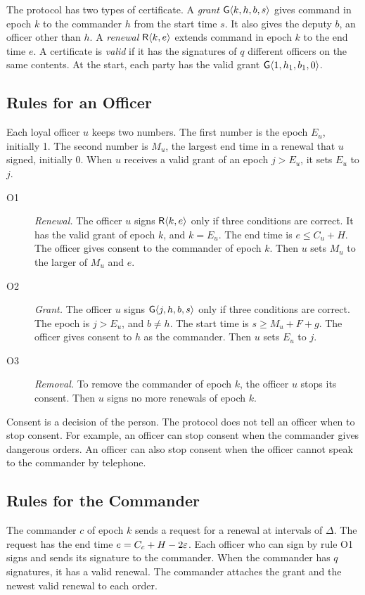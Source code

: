 The protocol has two types of certificate. A \emph{grant} $\mathsf{G}\langle k,h,b,s\rangle$ gives command
in epoch $k$ to the commander $h$ from the start time $s$. It also gives the deputy $b$,
an officer other than $h$. A
\emph{renewal} $\mathsf{R}\langle k,e\rangle$ extends command in epoch $k$ to the end time $e$. A
certificate is \emph{valid} if it has the signatures of $q$ different officers on the same
contents. At the start, each party has the valid grant $\mathsf{G}\langle 1,h_1,b_1,0\rangle$.

\subsection{Rules for an Officer}

Each loyal officer $u$ keeps two numbers. The first number is the epoch $E_u$, initially 1.
The second number is $M_u$, the largest end time in a renewal that $u$ signed, initially 0.
When $u$ receives a valid grant of an epoch $j > E_u$, it sets $E_u$ to $j$.

\begin{description}
  \item[O1] \emph{Renewal.} The officer $u$ signs $\mathsf{R}\langle k,e\rangle$ only if three
  conditions are correct. It has the valid grant of epoch $k$, and $k = E_u$. The end time is
  $e \le C_u + H$. The officer gives consent to the commander of epoch $k$. Then $u$ sets
  $M_u$ to the larger of $M_u$ and $e$.
  \item[O2] \emph{Grant.} The officer $u$ signs $\mathsf{G}\langle j,h,b,s\rangle$ only if three conditions are
  correct. The epoch is $j > E_u$, and $b \ne h$. The start time is $s \ge M_u + F + g$. The officer gives
  consent to $h$ as the commander. Then $u$ sets $E_u$ to $j$.
  \item[O3] \emph{Removal.} To remove the commander of epoch $k$, the officer $u$ stops its
  consent. Then $u$ signs no more renewals of epoch $k$.
\end{description}

Consent is a decision of the person. The protocol does not tell an officer when to stop
consent. For example, an officer can stop consent when the commander gives dangerous
orders. An officer can also stop consent when the officer cannot speak to the commander by
telephone.

\subsection{Rules for the Commander}

The commander $c$ of epoch $k$ sends a request for a renewal at intervals of $\Delta$. The
request has the end time $e = C_c + H - 2\varepsilon$. Each officer who can sign by rule O1 signs
and sends its signature to the commander. When the commander has $q$ signatures, it has a
valid renewal. The commander attaches the grant and the newest valid renewal to each order.

